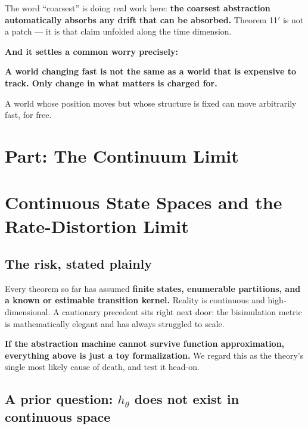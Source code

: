 \documentclass[11pt]{article}
\renewenvironment{quote}
  {\def\FrameCommand{{\color{gray!60}\vrule width 2pt}\hspace{8pt}}%
   \MakeFramed{\advance\hsize-\width \FrameRestore}\begin{itshape}}
  {\end{itshape}\endMakeFramed}
\begin{document}
The word ``coarsest'' is doing real work here: \textbf{the coarsest abstraction automatically absorbs any drift that can be absorbed.} Theorem 11\('\) is not a patch --- it is that claim unfolded along the time dimension.

\textbf{And it settles a common worry precisely:}

\begin{quote}
\textbf{A world changing fast is not the same as a world that is expensive to track. Only change in what matters is charged for.}

A world whose position moves but whose structure is fixed can move arbitrarily fast, for free.
\end{quote}

\hypertarget{part-the-continuum-limit}{%
\section*{Part: The Continuum Limit}\label{part-the-continuum-limit}}

\hypertarget{continuous-state-spaces-and-the-rate-distortion-limit}{%
\section{Continuous State Spaces and the Rate-Distortion Limit}\label{continuous-state-spaces-and-the-rate-distortion-limit}}

\hypertarget{the-risk-stated-plainly}{%
\subsection{The risk, stated plainly}\label{the-risk-stated-plainly}}

Every theorem so far has assumed \textbf{finite states, enumerable partitions, and a known or estimable transition kernel.} Reality is continuous and high-dimensional. A cautionary precedent sits right next door: the bisimulation metric is mathematically elegant and has always struggled to scale.

\textbf{If the abstraction machine cannot survive function approximation, everything above is just a toy formalization.} We regard this as the theory's single most likely cause of death, and test it head-on.

\hypertarget{a-prior-question-h_theta-does-not-exist-in-continuous-space}{%
\subsection{\texorpdfstring{A prior question: \(h_\theta\) does not exist in continuous space}{A prior question: h\_\textbackslash theta does not exist in continuous space}}\label{a-prior-question-h_theta-does-not-exist-in-continuous-space}}
\end{document}
